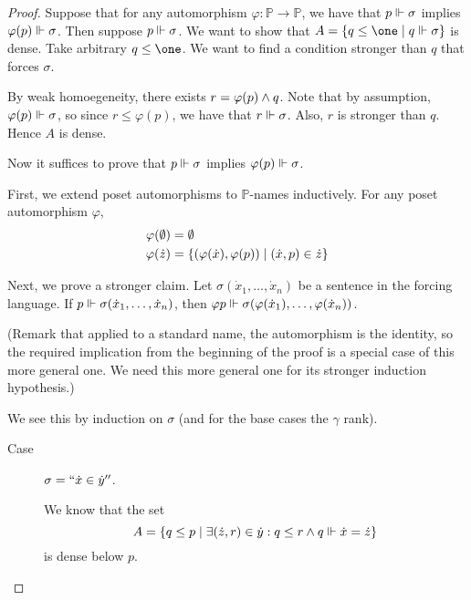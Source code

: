 \documentclass[11pt]{article}
\renewcommand{\P}{\mathbb{P}}
\renewcommand{\phi}{\varphi}
\begin{document}
\begin{proof}
    Suppose that for any automorphism $\phi : \P \to \P$, we have that
    $p \Vdash \sigma$ implies $\phi(p) \forces \sigma$.
    Then suppose $p \Vdash \sigma$.
    We want to show that $A = \setof{q \leq \one \sth q \forces \sigma}$ is
    dense. Take arbitrary $q \leq \one$.
    We want to find a condition stronger than $q$ that forces $\sigma$.

    By weak homoegeneity,
    there exists $r = \phi(p) \meet q$.
    Note that by assumption, $\phi(p) \forces \sigma$, so since
    $r \leq \phi(p)$, we have that $r \Vdash \sigma$.
    Also, $r$ is stronger than $q$. Hence $A$ is dense.

    Now it suffices to prove that
    $p \Vdash \sigma$ implies $\phi(p) \forces \sigma$.

    First, we extend poset automorphisms to $\P$-names inductively.
    For any poset automorphism $\phi$,
    \begin{align*}
        \phi(\emptyset) &= \emptyset \\
        \phi(\dot z) &= \setof{
            (\phi(\dot x), \phi(p)) \sth
            (\dot x, p) \in \dot z
        }
    \end{align*}

    Next, we prove a stronger claim.
    Let $\sigma(\dot x_1, \ldots, \dot x_n)$ be a sentence in the forcing
    language.
    If $p \Vdash \sigma(\dot x_1, \ldots, \dot x_n)$,
    then $\phi p \forces \sigma(\phi(\dot x_1), \ldots, \phi(\dot x_n))$.

    (Remark that applied to a standard name, the automorphism is the identity,
    so the required implication from the beginning of the proof is a special
    case of this more general one. We need this more general one for its
    stronger induction hypothesis.)

    We see this by induction on $\sigma$ (and for the base cases the $\gamma$
    rank).

    \begin{description}
        \item[Case] $\sigma = ``\dot x \in \dot y''$.

            We know that the set
            \begin{equation*}
                A = \left\{
                    q \leq p \;\vert\;
                    \exists (\dot z, r) \in \dot y :
                    q \leq r \land q \Vdash \dot x = \dot z
                \right\}
            \end{equation*}
            is dense below $p$.


\end{description}
\end{proof}
\end{document}
